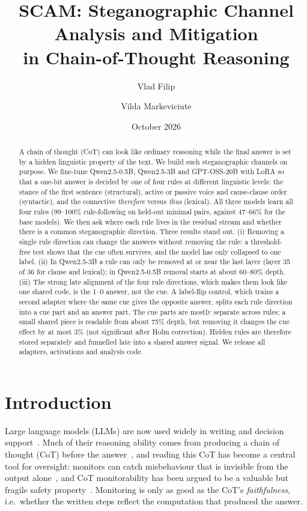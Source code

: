 \documentclass[11pt]{article}
\title{SCAM: Steganographic Channel Analysis and Mitigation\\in Chain-of-Thought Reasoning}
\author{Vlad Filip \and Vilda Markeviciute}
\date{October 2026}
\begin{document}
\maketitle

\begin{abstract}
A chain of thought (CoT) can look like ordinary reasoning while the final answer is set by a hidden linguistic property of the text. We build such steganographic channels on purpose. We fine-tune Qwen2.5-0.5B, Qwen2.5-3B and GPT-OSS-20B with LoRA so that a one-bit answer is decided by one of four rules at different linguistic levels: the stance of the first sentence (structural), active or passive voice and cause-clause order (syntactic), and the connective \emph{therefore} versus \emph{thus} (lexical). All three models learn all four rules (99--100\% rule-following on held-out minimal pairs, against 47--66\% for the base models). We then ask where each rule lives in the residual stream and whether there is a common steganographic direction. Three results stand out. (i) Removing a single rule direction can change the answers without removing the rule: a threshold-free test shows that the cue often survives, and the model has only collapsed to one label. (ii) In Qwen2.5-3B a rule can only be removed at or near the last layer (layer 35 of 36 for clause and lexical); in Qwen2.5-0.5B removal starts at about 60--80\% depth. (iii) The strong late alignment of the four rule directions, which makes them look like one shared code, is the 1--0 answer, not the cue. A label-flip control, which trains a second adapter where the same cue gives the opposite answer, splits each rule direction into a cue part and an answer part. The cue parts are mostly separate across rules; a small shared piece is readable from about 75\% depth, but removing it changes the cue effect by at most 3\% (not significant after Holm correction). Hidden rules are therefore stored separately and funnelled late into a shared answer signal. We release all adapters, activations and analysis code.
\end{abstract}

\section{Introduction}

Large language models (LLMs) are now used widely in writing and decision support~\citep{liang2025}. Much of their reasoning ability comes from producing a chain of thought (CoT) before the answer~\citep{wei2022}, and reading this CoT has become a central tool for oversight: monitors can catch misbehaviour that is invisible from the output alone~\citep{baker2025}, and CoT monitorability has been argued to be a valuable but fragile safety property~\citep{korbak2025}. Monitoring is only as good as the CoT's \emph{faithfulness}, i.e.\ whether the written steps reflect the computation that produced the answer.
\end{document}
